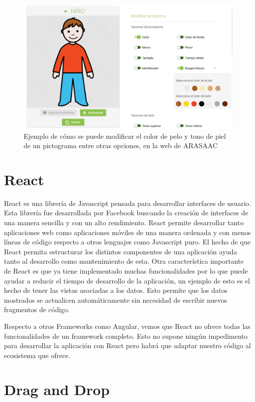 \begin{figure}
	\centering
	\includegraphics[width=0.7\linewidth]{Imagenes/Bitmap/coloresPicto}
	\caption{Ejemplo de cómo se puede modificar el color de pelo y tono de piel de un pictograma entre otras opciones, en la web de ARASAAC}
	\label{fig:colorespicto}
\end{figure}

\section{React}

React es una librería de Javascript pensada para desarrollar interfaces de usuario. Esta librería fue desarrollada por Facebook buscando la creación de interfaces de una manera sencilla y con un alto rendimiento. 
React permite desarrollar tanto aplicaciones web como aplicaciones móviles de una manera ordenada y con menos líneas de código respecto a otros lenguajes como Javascript puro. El hecho de que React permita estructurar los distintos componentes de una aplicación ayuda tanto al desarrollo como mantenimiento de esta.
Otra característica importante de React es que ya tiene implementado muchas funcionalidades por lo que puede ayudar a reducir el tiempo de desarrollo de la aplicación, un ejemplo de esto es el hecho de tener las vistas asociadas a los datos. Esto permite que los datos mostrados se actualicen automáticamente sin necesidad de escribir nuevos fragmentos de código.

Respecto a otros Frameworks como Angular, vemos que React no ofrece todas las funcionalidades de un framework completo. Esto no supone ningún impedimento para desarrollar la aplicación con React pero habrá que adaptar nuestro código al ecosistema que ofrece.

\section{Drag and Drop}

